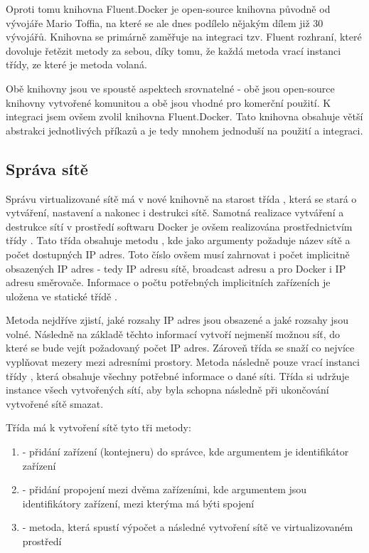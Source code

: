 Oproti tomu knihovna Fluent.Docker je open-source knihovna původně od vývojáře Mario Toffia, na které se ale dnes podílelo nějakým dílem již 30 vývojářů. Knihovna se primárně zaměřuje na integraci tzv. Fluent rozhraní, které dovoluje řetězit metody za sebou, díky tomu, že každá metoda vrací instanci třídy, ze které je metoda volaná. \cite{fluentinterface}

Obě knihovny jsou ve spoustě aspektech srovnatelné - obě jsou open-source knihovny vytvořené komunitou a obě jsou vhodné pro komerční použití. K integraci jsem ovšem zvolil knihovna Fluent.Docker. Tato knihovna obsahuje větší abstrakci jednotlivých příkazů a je tedy mnohem jednoduší na použití a integraci.

\subsection{Správa sítě}

Správu virtualizované sítě má v nové knihovně na starost třída , která se stará o vytváření, nastavení a nakonec i destrukci sítě. 
Samotná realizace vytváření a destrukce sítí v prostředí softwaru Docker je ovšem realizována prostřednictvím třídy . Tato třída obsahuje metodu , kde jako argumenty požaduje název sítě a počet dostupných IP adres. Toto číslo ovšem musí zahrnovat i počet implicitně obsazených IP adres - tedy IP adresu sítě, broadcast adresu a pro Docker i IP adresu směrovače. Informace o počtu potřebných implicitních zařízeních je uložena ve statické třídě .

Metoda  nejdříve zjistí, jaké rozsahy IP adres jsou obsazené a jaké rozsahy jsou volné. Následně na základě těchto informací vytvoří nejmenší možnou síť, do které se bude vejít požadovaný počet IP adres. Zároveň třída se snaží  co nejvíce vyplňovat mezery mezi adresními prostory. Metoda následně pouze vrací instanci třídy , která obsahuje všechny potřebné informace o dané síti. Třída  si udržuje instance všech vytvořených sítí, aby byla schopna následně při ukončování vytvořené sítě smazat. 

Třída  má k vytvoření sítě tyto tři metody:

\begin{enumerate}
    \item {} - přidání zařízení (kontejneru) do správce, kde argumentem je identifikátor zařízení
    \item {} - přidání propojení mezi dvěma zařízeními, kde argumentem jsou identifikátory zařízení, mezi kterýma má býti spojení
    \item {} - metoda, která spustí výpočet a následné vytvoření sítě ve virtualizovaném prostředí
\end{enumerate}

